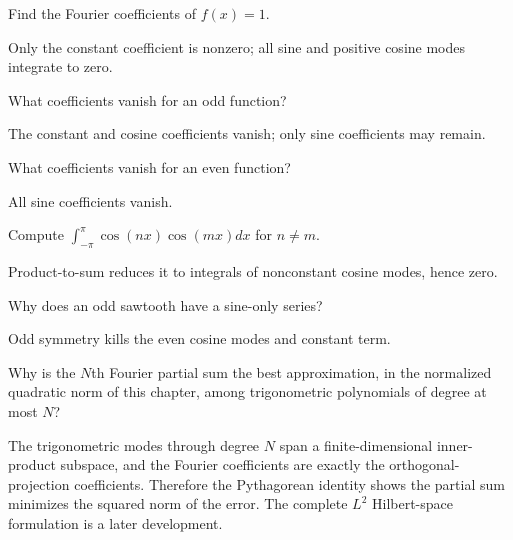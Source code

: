 \begin{problem}\label{prob:ii14-problem-01}
Find the Fourier coefficients of $f(x)=1$.
\end{problem}
\begin{solution}
Only the constant coefficient is nonzero; all sine and positive cosine modes integrate to zero.
\end{solution}

\begin{problem}\label{prob:ii14-problem-02}
What coefficients vanish for an odd function?
\end{problem}
\begin{solution}
The constant and cosine coefficients vanish; only sine coefficients may remain.
\end{solution}

\begin{problem}\label{prob:ii14-problem-03}
What coefficients vanish for an even function?
\end{problem}
\begin{solution}
All sine coefficients vanish.
\end{solution}

\begin{problem}\label{prob:ii14-problem-04}
Compute $\int_{-\pi}^{\pi}\cos(nx)\cos(mx)dx$ for $n\ne m$.
\end{problem}
\begin{solution}
Product-to-sum reduces it to integrals of nonconstant cosine modes, hence zero.
\end{solution}

\begin{problem}\label{prob:ii14-problem-05}
Why does an odd sawtooth have a sine-only series?
\end{problem}
\begin{solution}
Odd symmetry kills the even cosine modes and constant term.
\end{solution}

\begin{problem}\label{prob:ii14-problem-06}
Why is the $N$th Fourier partial sum the best approximation, in the normalized quadratic norm of this chapter, among trigonometric polynomials of degree at most $N$?
\end{problem}
\begin{solution}
The trigonometric modes through degree $N$ span a finite-dimensional inner-product subspace, and the Fourier coefficients are exactly the orthogonal-projection coefficients. Therefore the Pythagorean identity shows the partial sum minimizes the squared norm of the error. The complete $L^2$ Hilbert-space formulation is a later development.
\end{solution}

